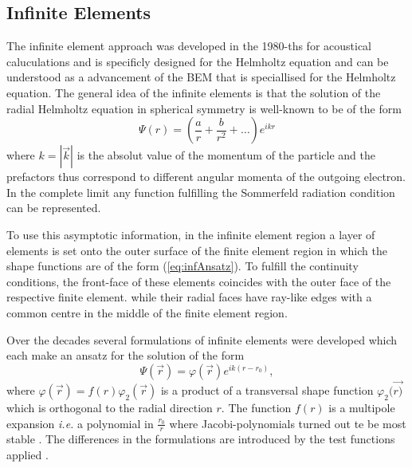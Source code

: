 \subsection{Infinite Elements}
\label{ch:InfEl}
The infinite element approach was developed in the 1980-ths for acoustical caluculations and is specificly designed for the Helmholtz equation and can be understood as a advancement of the BEM that is speciallised for the Helmholtz equation.
The general idea of the infinite elements is that the solution of the radial Helmholtz equation in spherical symmetry is well-known to be of the form
\begin{equation} \label{eq:infAnsatz}
 \Psi(r) = \left(\frac ar +\frac{b}{r^2} + \hdots \right) e^{ikr}
\end{equation}
where $k=|\vec{k}|$ is the absolut value of the momentum of the particle and the prefactors thus correspond to different angular momenta of the outgoing electron.
In the complete limit any function fulfilling the Sommerfeld radiation condition \cite{sommerfeldCond} can be represented.

To use this asymptotic information, in the infinite element region a layer of elements is set onto the outer surface of the finite element region in which the shape functions are of the form (\ref{eq:infAnsatz}).
To fulfill the continuity conditions, the front-face of these elements coincides with the outer face of the respective finite element. while their radial faces have ray-like edges with a common centre in the middle of the finite element region.

Over the decades several formulations of infinite elements were developed which each make an ansatz for the solution of the form
\begin{equation} \label{eq:Infansatz}
 \Psi(\vec{r}) = \varphi(\vec{r}) e^{ik(r-r_0)},
\end{equation}
where $\varphi(\vec{r})=f(r)\varphi_2(\vec{r})$ is a product of a transversal shape function $\varphi_2(\vec{r)}$ which is orthogonal to the radial direction $r$.
The function $f(r)$ is a multipole expansion \textit{i.e.} a polynomial in $\frac{r_0}{r}$ where Jacobi-polynomials turned out te be most stable \cite{dreyer_improved}.
The differences in the formulations are introduced by the test functions applied \cite{Astley}.

